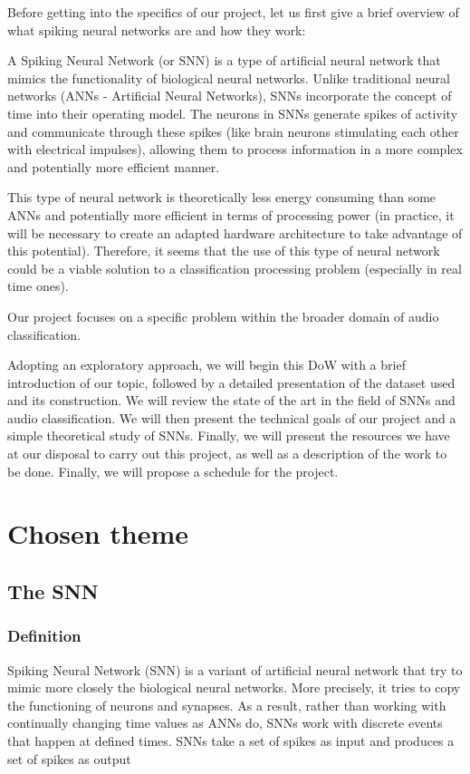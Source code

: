 \documentclass[11pt]{article}
\begin{document}
Before getting into the specifics of our project, let us first give a brief overview of what spiking neural networks are and how they work:

A Spiking Neural Network (or SNN) is a type of artificial neural network that mimics the functionality of biological neural networks. Unlike traditional neural networks (ANNs - Artificial Neural Networks), SNNs incorporate the concept of time into their operating model. The neurons in SNNs generate spikes of activity and communicate through these spikes (like brain neurons stimulating each other with electrical impulses), allowing them to process information in a more complex and potentially more efficient manner.

This type of neural network is theoretically less energy consuming than some ANNs and potentially more efficient in terms of processing power (in practice, it will be necessary to create an adapted hardware architecture to take advantage of this potential). Therefore, it seems that the use of this type of neural network could be a viable solution to a classification processing problem (especially in real time ones).

Our project focuses on a specific problem within the broader domain of audio classification.

Adopting an exploratory approach, we will begin this DoW with a brief introduction of our topic, followed by a detailed presentation of the dataset used and its construction. We will review the state of the art in the field of SNNs and audio classification. We will then present the technical goals of our project and a simple theoretical study of SNNs. Finally, we will present the resources we have at our disposal to carry out this project, as well as a description of the work to be done. Finally, we will propose a schedule for the project.




\section{Chosen theme}
\subsection{The SNN}
\subsubsection{Definition}
Spiking Neural Network (SNN) is a variant of artificial neural network that try to mimic more closely the biological neural networks. More precisely, it tries to copy the functioning of neurons and synapses. As a result, rather than working with continually changing time values as ANNs do, SNNs work with discrete events that happen at defined times. SNNs take a set of spikes as input and produces a set of spikes as output
\end{document}
